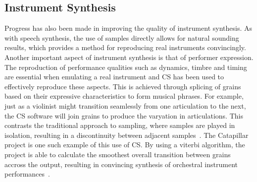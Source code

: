 \documentclass{scrartcl}
\begin{document}
    \subsection*{Instrument Synthesis}
    Progress has also been made in improving the quality of instrument
    synthesis. As with speech synthesis, the use of samples directly allows for
    natural sounding results, which provides a method for reproducing real
    instruments convincingly. Another important aspect of instrument synthesis is that of performer
    expression. The reproduction of performance qualities such as dynamics,
    timbre and timing are essential when emulating a real instrument and CS has
    been used to effectively reproduce these aspects. This is achieved through
    splicing of grains based on their expressive characteristics to form
    musical phrases.  For example, just as a violinist might transition
    seamlessly from one articulation to the next, the CS software will join
    grains to produce the varyation in articulations. This contrasts the
    traditional approach to sampling, where samples are played in isolation,
    resulting in a discontinuity between adjacent samples~\parencite[p.82]{Lindemann2007}. 
    The Catapillar project is one such example of this use of CS. 
    By using a viterbi algorithm, the project is able to calculate the
    smoothest overall transition between grains accross the output, resulting
    in convincing synthesis of orchestral instrument performances~\parencite[p.5]{Schwarz2003}.
\end{document}
